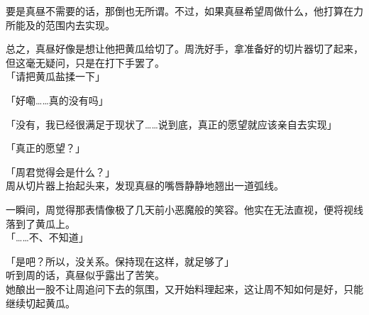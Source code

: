 要是真昼不需要的话，那倒也无所谓。不过，如果真昼希望周做什么，他打算在力所能及的范围内去实现。

总之，真昼好像是想让他把黄瓜给切了。周洗好手，拿准备好的切片器切了起来，但这毫无疑问，只是在打下手罢了。\\

「请把黄瓜盐揉一下」

「好嘞……真的没有吗」

「没有，我已经很满足于现状了……说到底，真正的愿望就应该亲自去实现」

「真正的愿望？」

「周君觉得会是什么？」\\

周从切片器上抬起头来，发现真昼的嘴唇静静地翘出一道弧线。

一瞬间，周觉得那表情像极了几天前小恶魔般的笑容。他实在无法直视，便将视线落到了黄瓜上。\\

「……不、不知道」

「是吧？所以，没关系。保持现在这样，就足够了」\\

听到周的话，真昼似乎露出了苦笑。\\

她酿出一股不让周追问下去的氛围，又开始料理起来，这让周不知如何是好，只能继续切起黄瓜。
